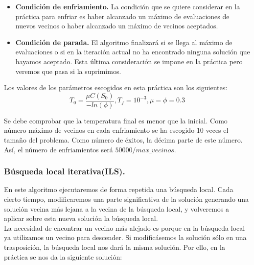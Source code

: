 \begin{itemize}
	 \item \textbf{Condición de enfriamiento.} La condición que se quiere considerar en la práctica para enfriar es haber alcanzado un máximo de evaluaciones de nuevos vecinos o haber alcanzado un máximo de vecinos aceptados.
	 
	 \item \textbf{Condición de parada.} El algoritmo finalizará si se llega al máximo de evaluaciones o si en la iteración actual no ha encontrado ninguna solución que hayamos aceptado. Esta última consideración se impone en la práctica pero veremos que pasa si la suprimimos.
	
	
\end{itemize}

Los valores de los parámetros escogidos en esta práctica son los siguientes:\\

\[T_0=\dfrac{\mu C(S_0)}{-ln(\phi)},T_f=10^{-3},\mu=\phi=0.3\]

Se debe comprobar que la temperatura final es menor que la inicial. Como número máximo de vecinos en cada enfriamiento se ha escogido 10 veces el tamaño del problema. Como número de éxitos, la décima parte de este número. Así, el número de enfriamientos será $50000/max\_vecinos$.



\subsubsection{Búsqueda local iterativa(ILS).}

En este algoritmo ejecutaremos de forma repetida una búsqueda local. Cada cierto tiempo, modificaremos una parte significativa de la solución generando una solución vecina más lejana a la vecina de la búsqueda local, y volveremos a aplicar sobre esta nueva solución la búsqueda local. \\

La necesidad de encontrar un vecino más alejado es porque en la búsqueda local ya utilizamos un vecino para descender. Si modificásemos la solución sólo en una trasposición, la búsqueda local nos dará la misma solución. Por ello, en la práctica se nos da la siguiente solución:\\

